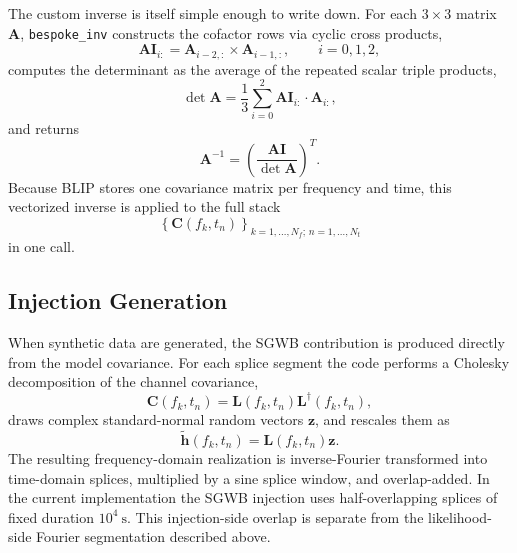\documentclass[11pt]{article}
\begin{document}
The custom inverse is itself simple enough to write down. For each $3\times 3$ matrix $\mathbf{A}$, \texttt{bespoke\_inv} constructs the cofactor rows via cyclic cross products,
\begin{equation}
\mathbf{AI}_{i:}=\mathbf{A}_{i-2,:}\times \mathbf{A}_{i-1,:},
\qquad
i=0,1,2,
\end{equation}
computes the determinant as the average of the repeated scalar triple products,
\begin{equation}
\det \mathbf{A}
=\frac{1}{3}\sum_{i=0}^{2} \mathbf{AI}_{i:}\cdot \mathbf{A}_{i:},
\end{equation}
and returns
\begin{equation}
\mathbf{A}^{-1}=\left(\frac{\mathbf{AI}}{\det \mathbf{A}}\right)^{T}.
\end{equation}
Because BLIP stores one covariance matrix per frequency and time, this vectorized inverse is applied to the full stack
\begin{equation}
\left\{\mathbf{C}(f_k,t_n)\right\}_{k=1,\dots,N_f;\,n=1,\dots,N_t}
\end{equation}
in one call.

\subsection{Injection Generation}
When synthetic data are generated, the SGWB contribution is produced directly from the model covariance. For each splice segment the code performs a Cholesky decomposition of the channel covariance,
\begin{equation}
\mathbf{C}(f_k,t_n)=\mathbf{L}(f_k,t_n)\mathbf{L}^{\dagger}(f_k,t_n),
\end{equation}
draws complex standard-normal random vectors $\bm{z}$, and rescales them as
\begin{equation}
\tilde{\bm{h}}(f_k,t_n)=\mathbf{L}(f_k,t_n)\bm{z}.
\end{equation}
The resulting frequency-domain realization is inverse-Fourier transformed into time-domain splices, multiplied by a sine splice window, and overlap-added. In the current implementation the SGWB injection uses half-overlapping splices of fixed duration $10^4\ \mathrm{s}$. This injection-side overlap is separate from the likelihood-side Fourier segmentation described above.
\end{document}
